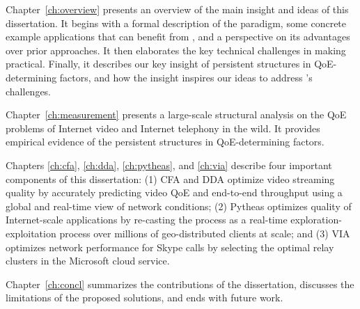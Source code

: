 Chapter~\ref{ch:overview} presents an overview of the main insight and 
ideas of this dissertation.
It begins with a formal description of the \ddn paradigm, some
concrete example applications that can benefit from \ddn, and a
perspective on its advantages over prior approaches.
It then elaborates the key technical challenges in making \ddn practical. 
Finally, it describes our key insight of persistent structures in 
QoE-determining factors, and how the insight inspires our ideas to 
address \ddn's challenges.

Chapter~\ref{ch:measurement} presents a large-scale structural analysis
on the QoE problems of Internet video and Internet telephony in the wild.
It provides empirical evidence of the persistent structures in QoE-determining
factors. 

Chapters \ref{ch:cfa}, \ref{ch:dda}, \ref{ch:pytheas}, and \ref{ch:via} 
describe four important components of this dissertation: 
(1) CFA and DDA optimize video streaming quality by accurately predicting 
video QoE and end-to-end throughput using a global and real-time view of 
network conditions;
(2) Pytheas optimizes quality of Internet-scale applications by re-casting
the \ddn process as a real-time exploration-exploitation process 
over millions of geo-distributed clients at scale; and
(3) VIA optimizes network performance for Skype calls by selecting
the optimal relay clusters in the Microsoft cloud service.

Chapter~\ref{ch:concl} summarizes the contributions of the dissertation, 
discusses the limitations of the proposed solutions, and ends with future 
work.










